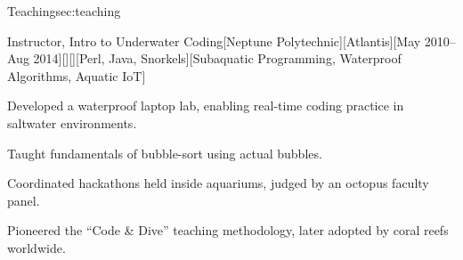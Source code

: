 \documentclass[11pt, letterpaper, extended ]{i-am-developer}
\begin{document}
\begin{devCVSection}{Teaching}{sec:teaching}
  \begin{devRole}{Instructor, Intro to Underwater Coding}[Neptune
    Polytechnic][Atlantis][May 2010--Aug
    2014][\faAnchor][\faMapMarker][Perl, Java, Snorkels][Subaquatic
    Programming, Waterproof Algorithms, Aquatic IoT]
    \begin{devItemize}
    \item Developed a waterproof laptop lab, enabling real-time
      coding practice in saltwater environments.
    \item Taught fundamentals of bubble-sort using actual bubbles.
    \item Coordinated hackathons held inside aquariums, judged by an
      octopus faculty panel.
    \item Pioneered the “Code \& Dive” teaching methodology, later
      adopted by coral reefs worldwide.
    \end{devItemize}
  \end{devRole}
\end{devCVSection}
\end{document}
